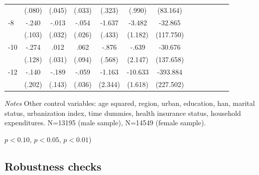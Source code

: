 \begin{table}[hp]
\begin{adjustbox}{max width=\linewidth}
\begin{threeparttable}
{\begin{tabular}{l*{6}{S S}}
                &   (.080)         &   (.045)         &   (.033)         &   (.323)         &   (.990)         & (83.164)         \\
-8             &    -.240\sym{**} &    -.013         &    -.054\sym{**} &   -1.637\sym{***}&   -3.482\sym{***}&  -32.865         \\
                &   (.103)         &   (.032)         &   (.026)         &   (.433)         &  (1.182)         &(117.750)         \\
-10            &    -.274\sym{**} &     .012         &     .062         &    -.876         &    -.639         &  -30.676         \\
                &   (.128)         &   (.031)         &   (.094)         &   (.568)         &  (2.147)         &(137.658)         \\
-12           &    -.140         &    -.189         &    -.059         &   -1.163         &  -10.633\sym{***}& -393.884\sym{*}  \\
                &   (.202)         &   (.143)         &   (.036)         &  (2.344)         &  (1.618)         &(227.502)         \\     
\bottomrule
\end{tabular}
\begin{tablenotes}
\item \textit{Notes} Other control variables: age squared, region, urban, education, han, marital status, urbanization index, time dummies, health insurance status, household expenditures. N=13195 (male sample), N=14549 (female sample).
\item \sym{*} \(p<0.10\), \sym{**} \(p<0.05\), \sym{***} \(p<0.01\))
\end{tablenotes}
}
\end{threeparttable}
\end{adjustbox}
\end{table}
\FloatBarrier

\subsection*{Robustness checks}

